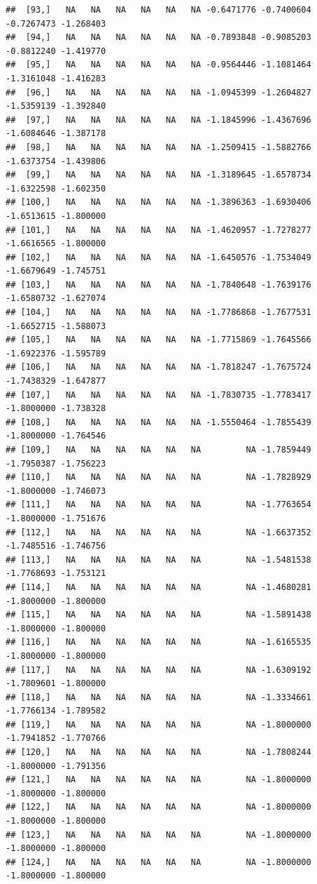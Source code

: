 \documentclass{article}\usepackage[]{graphicx}\usepackage[]{color}
\makeatletter
\newenvironment{kframe}{%
 \def\at@end@of@kframe{}%
 \ifinner\ifhmode%
  \def\at@end@of@kframe{\end{minipage}}%
  \begin{minipage}{\columnwidth}%
 \fi\fi%
 \def\FrameCommand##1{\hskip\@totalleftmargin \hskip-\fboxsep
 \colorbox{shadecolor}{##1}\hskip-\fboxsep
     \hskip-\linewidth \hskip-\@totalleftmargin \hskip\columnwidth}%
 \MakeFramed {\advance\hsize-\width
   \@totalleftmargin\z@ \linewidth\hsize
   \@setminipage}}%
 {\par\unskip\endMakeFramed%
 \at@end@of@kframe}
\newenvironment{knitrout}{}{} %
\makeatother
\begin{document}
\begin{knitrout}
\begin{kframe}
\begin{verbatim}
##  [93,]   NA   NA   NA   NA   NA   NA -0.6471776 -0.7400604 -0.7267473 -1.268403
##  [94,]   NA   NA   NA   NA   NA   NA -0.7893848 -0.9085203 -0.8812240 -1.419770
##  [95,]   NA   NA   NA   NA   NA   NA -0.9564446 -1.1081464 -1.3161048 -1.416283
##  [96,]   NA   NA   NA   NA   NA   NA -1.0945399 -1.2604827 -1.5359139 -1.392840
##  [97,]   NA   NA   NA   NA   NA   NA -1.1845996 -1.4367696 -1.6084646 -1.387178
##  [98,]   NA   NA   NA   NA   NA   NA -1.2509415 -1.5882766 -1.6373754 -1.439806
##  [99,]   NA   NA   NA   NA   NA   NA -1.3189645 -1.6578734 -1.6322598 -1.602350
## [100,]   NA   NA   NA   NA   NA   NA -1.3896363 -1.6930406 -1.6513615 -1.800000
## [101,]   NA   NA   NA   NA   NA   NA -1.4620957 -1.7278277 -1.6616565 -1.800000
## [102,]   NA   NA   NA   NA   NA   NA -1.6450576 -1.7534049 -1.6679649 -1.745751
## [103,]   NA   NA   NA   NA   NA   NA -1.7840648 -1.7639176 -1.6580732 -1.627074
## [104,]   NA   NA   NA   NA   NA   NA -1.7786868 -1.7677531 -1.6652715 -1.588073
## [105,]   NA   NA   NA   NA   NA   NA -1.7715869 -1.7645566 -1.6922376 -1.595789
## [106,]   NA   NA   NA   NA   NA   NA -1.7818247 -1.7675724 -1.7438329 -1.647877
## [107,]   NA   NA   NA   NA   NA   NA -1.7830735 -1.7783417 -1.8000000 -1.738328
## [108,]   NA   NA   NA   NA   NA   NA -1.5550464 -1.7855439 -1.8000000 -1.764546
## [109,]   NA   NA   NA   NA   NA   NA         NA -1.7859449 -1.7950387 -1.756223
## [110,]   NA   NA   NA   NA   NA   NA         NA -1.7828929 -1.8000000 -1.746073
## [111,]   NA   NA   NA   NA   NA   NA         NA -1.7763654 -1.8000000 -1.751676
## [112,]   NA   NA   NA   NA   NA   NA         NA -1.6637352 -1.7485516 -1.746756
## [113,]   NA   NA   NA   NA   NA   NA         NA -1.5481538 -1.7768693 -1.753121
## [114,]   NA   NA   NA   NA   NA   NA         NA -1.4680281 -1.8000000 -1.800000
## [115,]   NA   NA   NA   NA   NA   NA         NA -1.5891438 -1.8000000 -1.800000
## [116,]   NA   NA   NA   NA   NA   NA         NA -1.6165535 -1.8000000 -1.800000
## [117,]   NA   NA   NA   NA   NA   NA         NA -1.6309192 -1.7809601 -1.800000
## [118,]   NA   NA   NA   NA   NA   NA         NA -1.3334661 -1.7766134 -1.789582
## [119,]   NA   NA   NA   NA   NA   NA         NA -1.8000000 -1.7941852 -1.770766
## [120,]   NA   NA   NA   NA   NA   NA         NA -1.7808244 -1.8000000 -1.791356
## [121,]   NA   NA   NA   NA   NA   NA         NA -1.8000000 -1.8000000 -1.800000
## [122,]   NA   NA   NA   NA   NA   NA         NA -1.8000000 -1.8000000 -1.800000
## [123,]   NA   NA   NA   NA   NA   NA         NA -1.8000000 -1.8000000 -1.800000
## [124,]   NA   NA   NA   NA   NA   NA         NA -1.8000000 -1.8000000 -1.800000

\end{verbatim}
\end{kframe}
\end{knitrout}
\end{document}

